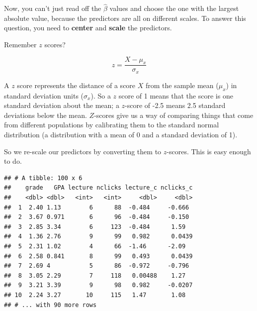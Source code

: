 \documentclass[]{book}
\newenvironment{Shaded}{\begin{snugshade}}{\end{snugshade}}
\newcommand{\DataTypeTok}[1]{\textcolor[rgb]{0.13,0.29,0.53}{#1}}
\newcommand{\KeywordTok}[1]{\textcolor[rgb]{0.13,0.29,0.53}{\textbf{#1}}}
\newcommand{\NormalTok}[1]{#1}
\newcommand{\OperatorTok}[1]{\textcolor[rgb]{0.81,0.36,0.00}{\textbf{#1}}}
\newcommand{\StringTok}[1]{\textcolor[rgb]{0.31,0.60,0.02}{#1}}
\begin{document}
Now, you can't just read off the \(\hat{\beta}\) values and choose the one with the largest absolute value, because the predictors are all on different scales. To answer this question, you need to \textbf{center} and \textbf{scale} the predictors.

Remember \(z\) scores?

\[
z = \frac{X - \mu_x}{\sigma_x}
\]

A \(z\) score represents the distance of a score \(X\) from the sample mean (\(\mu_x\)) in standard deviation units (\(\sigma_x\)). So a \(z\) score of 1 means that the score is one standard deviation about the mean; a \(z\)-score of -2.5 means 2.5 standard deviations below the mean. \(Z\)-scores give us a way of comparing things that come from different populations by calibrating them to the standard normal distribution (a distribution with a mean of 0 and a standard deviation of 1).

So we re-scale our predictors by converting them to \(z\)-scores. This is easy enough to do.

\begin{Shaded}
\end{Shaded}

\begin{verbatim}
## # A tibble: 100 x 6
##    grade   GPA lecture nclicks lecture_c nclicks_c
##    <dbl> <dbl>   <int>   <int>     <dbl>     <dbl>
##  1  2.40 1.13        6      88  -0.484     -0.666 
##  2  3.67 0.971       6      96  -0.484     -0.150 
##  3  2.85 3.34        6     123  -0.484      1.59  
##  4  1.36 2.76        9      99   0.982      0.0439
##  5  2.31 1.02        4      66  -1.46      -2.09  
##  6  2.58 0.841       8      99   0.493      0.0439
##  7  2.69 4           5      86  -0.972     -0.796 
##  8  3.05 2.29        7     118   0.00488    1.27  
##  9  3.21 3.39        9      98   0.982     -0.0207
## 10  2.24 3.27       10     115   1.47       1.08  
## # ... with 90 more rows
\end{verbatim}
\end{document}
